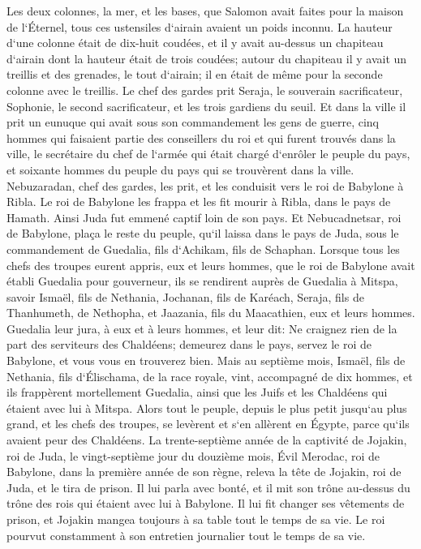 \verse Les deux colonnes, la mer, et les bases, que Salomon avait faites pour la maison de l`Éternel, tous ces ustensiles d`airain avaient un poids inconnu. 
\verse La hauteur d`une colonne était de dix-huit coudées, et il y avait au-dessus un chapiteau d`airain dont la hauteur était de trois coudées; autour du chapiteau il y avait un treillis et des grenades, le tout d`airain; il en était de même pour la seconde colonne avec le treillis. 
\verse Le chef des gardes prit Seraja, le souverain sacrificateur, Sophonie, le second sacrificateur, et les trois gardiens du seuil. 
\verse Et dans la ville il prit un eunuque qui avait sous son commandement les gens de guerre, cinq hommes qui faisaient partie des conseillers du roi et qui furent trouvés dans la ville, le secrétaire du chef de l`armée qui était chargé d`enrôler le peuple du pays, et soixante hommes du peuple du pays qui se trouvèrent dans la ville. 
\verse Nebuzaradan, chef des gardes, les prit, et les conduisit vers le roi de Babylone à Ribla. 
\verse Le roi de Babylone les frappa et les fit mourir à Ribla, dans le pays de Hamath. 
\verse Ainsi Juda fut emmené captif loin de son pays. Et Nebucadnetsar, roi de Babylone, plaça le reste du peuple, qu`il laissa dans le pays de Juda, sous le commandement de Guedalia, fils d`Achikam, fils de Schaphan. 
\verse Lorsque tous les chefs des troupes eurent appris, eux et leurs hommes, que le roi de Babylone avait établi Guedalia pour gouverneur, ils se rendirent auprès de Guedalia à Mitspa, savoir Ismaël, fils de Nethania, Jochanan, fils de Karéach, Seraja, fils de Thanhumeth, de Nethopha, et Jaazania, fils du Maacathien, eux et leurs hommes. 
\verse Guedalia leur jura, à eux et à leurs hommes, et leur dit: Ne craignez rien de la part des serviteurs des Chaldéens; demeurez dans le pays, servez le roi de Babylone, et vous vous en trouverez bien. 
\verse Mais au septième mois, Ismaël, fils de Nethania, fils d`Élischama, de la race royale, vint, accompagné de dix hommes, et ils frappèrent mortellement Guedalia, ainsi que les Juifs et les Chaldéens qui étaient avec lui à Mitspa. 
\verse Alors tout le peuple, depuis le plus petit jusqu`au plus grand, et les chefs des troupes, se levèrent et s`en allèrent en Égypte, parce qu`ils avaient peur des Chaldéens. 
\verse La trente-septième année de la captivité de Jojakin, roi de Juda, le vingt-septième jour du douzième mois, Évil Merodac, roi de Babylone, dans la première année de son règne, releva la tête de Jojakin, roi de Juda, et le tira de prison. 
\verse Il lui parla avec bonté, et il mit son trône au-dessus du trône des rois qui étaient avec lui à Babylone. 
\verse Il lui fit changer ses vêtements de prison, et Jojakin mangea toujours à sa table tout le temps de sa vie. 
\verse Le roi pourvut constamment à son entretien journalier tout le temps de sa vie. 
